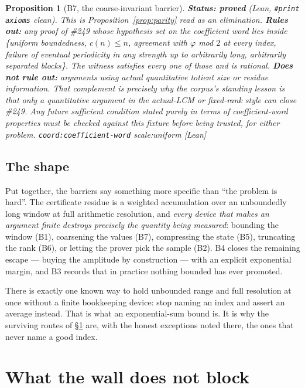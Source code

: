 \documentclass[11pt]{article}
\theoremstyle{plain}
\newtheorem{prop}[thm]{Proposition}
\theoremstyle{definition}
\theoremstyle{remark}
\newcommand{\ev}[1]{{\small\textsf{[#1]}}\xspace}
\newcommand{\scale}[1]{{\small\textsf{scale:#1}}\xspace}
\newcommand{\coord}[1]{\texorpdfstring{{\small\nolinkurl{coord:#1}}}{coord:#1}\xspace}
\begin{document}
\begin{prop}[B7, the coarse-invariant barrier]
\label{prop:b7}
\textbf{Status: proved} (Lean, \texttt{\#print axioms} clean). This is
Proposition~\ref{prop:parity} read as an elimination.
\textbf{Rules out:} any proof of \#249 whose hypothesis set on the coefficient
word lies inside \{uniform boundedness, $c(n) \le n$, agreement with $\varphi$
mod $2$ at every index, failure of eventual periodicity in any strength up to
arbitrarily long, arbitrarily separated blocks\}. The witness satisfies every
one of those and is rational.
\textbf{Does not rule out:} arguments using actual quantitative totient size or
residue information. That complement is precisely why the corpus's standing
lesson is that only a quantitative argument in the actual-LCM or fixed-rank
style can close \#249. Any future sufficient condition stated purely in terms
of coefficient-word properties must be checked against this fixture before
being trusted, for either problem.
\coord{coefficient-word} \scale{uniform} \ev{Lean}
\end{prop}

\subsection{The shape}

Put together, the barriers say something more specific than ``the problem is
hard''. The certificate residue is a weighted accumulation over an unboundedly
long window at full arithmetic resolution, and \emph{every device that makes an
argument finite destroys precisely the quantity being measured}: bounding the
window (B1), coarsening the values (B7), compressing the state (B5),
truncating the rank (B6), or letting the prover pick the sample (B2). B4
closes the remaining escape --- buying the amplitude by construction --- with
an explicit exponential margin, and B3 records that in practice nothing
bounded has ever promoted.

There is exactly one known way to hold unbounded range and full resolution at
once without a finite bookkeeping device: stop naming an index and assert an
average instead. That is what an exponential-sum bound is. It is why the
surviving routes of \S\ref{sec:survivors} are, with the honest exceptions noted
there, the ones that never name a good index.

\section{What the wall does not block}
\label{sec:survivors}
\end{document}
